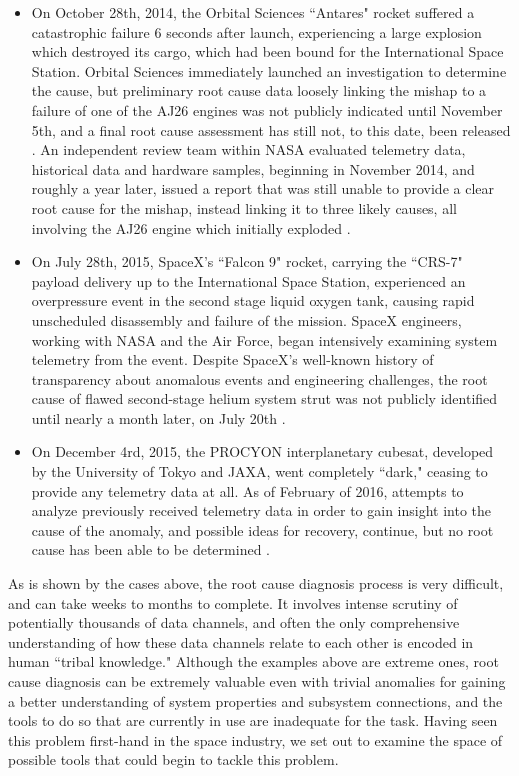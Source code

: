 \begin{itemize}

\item On October 28th, 2014, the Orbital Sciences ``Antares" rocket suffered a catastrophic failure 6 seconds after launch, experiencing a large explosion which destroyed its cargo, which had been bound for the International Space Station. Orbital Sciences immediately launched an investigation to determine the cause, but preliminary root cause data loosely linking the mishap to a failure of one of the AJ26 engines was not publicly indicated until November 5th, and a final root cause assessment has still not, to this date, been released \cite{spaceflight_antares}. An independent review team within NASA evaluated telemetry data, historical data and hardware samples, beginning in November 2014, and roughly a year later, issued a report that was still unable to provide a clear root cause for the mishap, instead linking it to three likely causes, all involving the AJ26 engine which initially exploded \cite{nasa_orb3}.

\item On July 28th, 2015, SpaceX's ``Falcon 9" rocket, carrying the ``CRS-7" payload delivery up to the International Space Station, experienced an overpressure event in the second stage liquid oxygen tank, causing rapid unscheduled disassembly and failure of the mission. SpaceX engineers, working with NASA and the Air Force, began intensively examining system telemetry from the event. Despite SpaceX's well-known history of transparency about anomalous events and engineering challenges, the root cause of flawed second-stage helium system strut was not publicly identified until nearly a month later, on July 20th \cite{spacex_crs7}.

\item On December 4rd, 2015, the PROCYON interplanetary cubesat, developed by the University of Tokyo and JAXA, went completely ``dark," ceasing to provide any telemetry data at all. As of February of 2016, attempts to analyze previously received telemetry data in order to gain insight into the cause of the anomaly, and possible ideas for recovery, continue, but no root cause has been able to be determined \cite{procyon_status}.

\end{itemize}

As is shown by the cases above, the root cause diagnosis process is very difficult, and can take weeks to months to complete. It involves intense scrutiny of potentially thousands of data channels, and often the only comprehensive understanding of how these data channels relate to each other is encoded in human ``tribal knowledge." Although the examples above are extreme ones, root cause diagnosis can be extremely valuable even with trivial anomalies for gaining a better understanding of system properties and subsystem connections, and the tools to do so that are currently in use are inadequate for the task. Having seen this problem first-hand in the space industry, we set out to examine the space of possible tools that could begin to tackle this problem.

